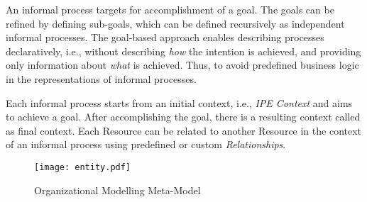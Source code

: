  An informal process targets for accomplishment of a goal. The goals can be refined by defining sub-goals, which can be defined recursively as independent informal processes. The goal-based approach enables describing processes declaratively, i.e., without describing \textit{how} the intention is achieved, and providing only information about \textit{what} is achieved. Thus, to avoid predefined business logic in the representations of informal processes. 

 Each informal process starts from an initial context, i.e., \textit{IPE Context} and aims to achieve a goal. After accomplishing the goal, there is a resulting context called as final context. Each Resource can be related to another Resource in the context of an informal process using predefined or custom \textit{Relationships}.
 
 \begin{figure}
 	\centering
 	\texttt{[image: entity.pdf]}
 	\caption{Organizational Modelling Meta-Model}
 	\label{fig:metamodel}
 \end{figure}
 

